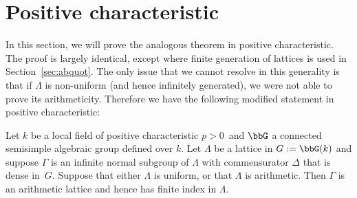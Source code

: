 \section{Positive characteristic}
\label{sec:char+}

In this section, we will prove the analogous theorem in positive characteristic. The proof is largely identical, except where finite generation of lattices is used in Section~\ref{sec:abquot}. The only issue that we cannot resolve in this generality is that if $\Lambda$ is non-uniform (and hence infinitely generated), we were not able to prove its arithmeticity. Therefore we have the following modified statement in positive characteristic:

\begin{thm}\label{thm:char+}
Let $k$ be a local field of positive characteristic $p>0$\, and $\bbG$ a connected semisimple algebraic group defined over $k$. Let $\Lambda$ be a lattice in $G:=\bbG(k)$ and suppose $\Gamma$ is an infinite normal subgroup of $\Lambda$ with commensurator $\Delta$ that is dense in~$G$. Suppose that either $\Lambda$ is uniform, or that $\Lambda$ is arithmetic. Then $\Gamma$ is an arithmetic lattice and hence has finite index in $\Lambda$.
\end{thm}
